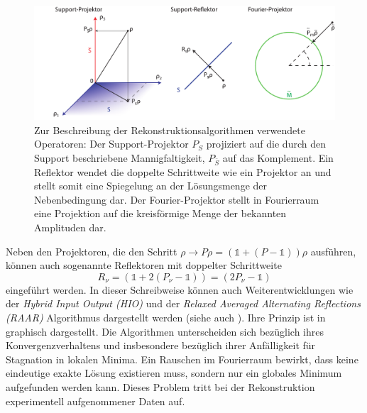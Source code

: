 \begin{figure}
	\centering
	\includegraphics[width=1\textwidth]{images/projektor.pdf}
	\caption[Operatoren zur Beschreibung der Rekonstruktionsalgorithmen]{Zur Beschreibung der Rekonstruktionsalgorithmen verwendete Operatoren: Der Support-Projektor $P_S$ projiziert auf die durch den Support beschriebene Mannigfaltigkeit, $P_{\bar{S}}$ auf das Komplement. Ein Reflektor wendet die doppelte Schrittweite wie ein Projektor an und stellt somit eine Spiegelung an der Lösungsmenge der Nebenbedingung dar. Der Fourier-Projektor stellt in Fourierraum eine Projektion auf die kreisförmige Menge der bekannten Amplituden dar.}
	\label{fig:projektoren}
\end{figure}
Neben den Projektoren, die den Schritt $\rho \rightarrow P\rho = (\mathbb{1}+(P-\mathbb{1}))\rho$ ausführen, können auch sogenannte Reflektoren mit doppelter Schrittweite
\begin{equation}
	R_\nu= (\mathbb{1}+2(P_\nu-\mathbb{1}))=(2P_\nu-\mathbb{1})
\end{equation}
eingeführt werden.
In dieser Schreibweise können auch Weiterentwicklungen wie der \textit{Hybrid Input Output (HIO)} und  der \textit{Relaxed Averaged Alternating Reflections (RAAR)} Algorithmus dargestellt werden (siehe auch ). Ihre Prinzip ist in  graphisch dargestellt. Die Algorithmen unterscheiden sich bezüglich ihres Konvergenzverhaltens und insbesondere bezüglich ihrer Anfälligkeit für Stagnation in lokalen Minima. 
Ein Rauschen im Fourierraum bewirkt, dass keine eindeutige exakte Lösung existieren muss, sondern nur ein globales Minimum aufgefunden werden kann. Dieses Problem tritt bei der Rekonstruktion experimentell aufgenommener Daten auf.
